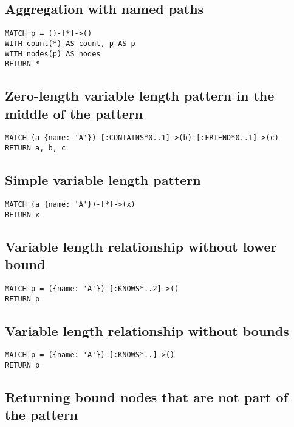 \subsection{Aggregation with named paths}

\begin{lstlisting}
MATCH p = ()-[*]->()
WITH count(*) AS count, p AS p
WITH nodes(p) AS nodes
RETURN *
\end{lstlisting}

\subsection{Zero-length variable length pattern in the middle of the pattern}

\begin{lstlisting}
MATCH (a {name: 'A'})-[:CONTAINS*0..1]->(b)-[:FRIEND*0..1]->(c)
RETURN a, b, c
\end{lstlisting}

\subsection{Simple variable length pattern}

\begin{lstlisting}
MATCH (a {name: 'A'})-[*]->(x)
RETURN x
\end{lstlisting}

\subsection{Variable length relationship without lower bound}

\begin{lstlisting}
MATCH p = ({name: 'A'})-[:KNOWS*..2]->()
RETURN p
\end{lstlisting}

\subsection{Variable length relationship without bounds}

\begin{lstlisting}
MATCH p = ({name: 'A'})-[:KNOWS*..]->()
RETURN p
\end{lstlisting}

\subsection{Returning bound nodes that are not part of the pattern}

